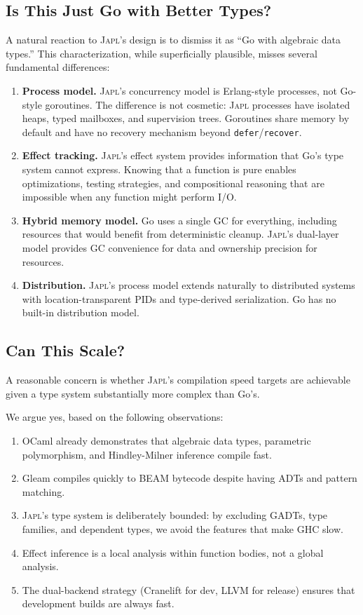 \documentclass[11pt,twocolumn]{article}
\newcommand{\japl}{\textsc{Japl}}
\begin{document}
\subsection{Is This Just Go with Better Types?}

A natural reaction to \japl{}'s design is to dismiss it as ``Go with algebraic data types.''
This characterization, while superficially plausible, misses several fundamental differences:

\begin{enumerate}[leftmargin=*]
\item \textbf{Process model.} \japl{}'s concurrency model is Erlang-style processes, not Go-style goroutines. The difference is not cosmetic: \japl{} processes have isolated heaps, typed mailboxes, and supervision trees. Goroutines share memory by default and have no recovery mechanism beyond \texttt{defer}/\texttt{recover}.

\item \textbf{Effect tracking.} \japl{}'s effect system provides information that Go's type system cannot express. Knowing that a function is pure enables optimizations, testing strategies, and compositional reasoning that are impossible when any function might perform I/O.

\item \textbf{Hybrid memory model.} Go uses a single GC for everything, including resources that would benefit from deterministic cleanup. \japl{}'s dual-layer model provides GC convenience for data and ownership precision for resources.

\item \textbf{Distribution.} \japl{}'s process model extends naturally to distributed systems with location-transparent PIDs and type-derived serialization. Go has no built-in distribution model.
\end{enumerate}

\subsection{Can This Scale?}

A reasonable concern is whether \japl{}'s compilation speed targets are achievable given a type system substantially more complex than Go's.

We argue yes, based on the following observations:
\begin{enumerate}[leftmargin=*]
\item OCaml already demonstrates that algebraic data types, parametric polymorphism, and Hindley-Milner inference compile fast.
\item Gleam compiles quickly to BEAM bytecode despite having ADTs and pattern matching.
\item \japl{}'s type system is deliberately bounded: by excluding GADTs, type families, and dependent types, we avoid the features that make GHC slow.
\item Effect inference is a local analysis within function bodies, not a global analysis.
\item The dual-backend strategy (Cranelift for dev, LLVM for release) ensures that development builds are always fast.
\end{enumerate}
\end{document}
